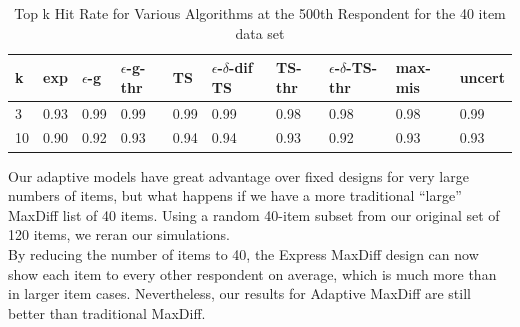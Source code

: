 \documentclass[a4paper,12pt]{article}
\newcommand{\fixedexpressS}{\textbf{exp}}
\newcommand{\egreedyS}{$\epsilon$-\textbf{g}}
\newcommand{\egreedythresS}{$\epsilon$-\textbf{g-thr}}
\newcommand{\misminS}{\textbf{max-mis}}
\newcommand{\tsS}{\textbf{TS} }
\newcommand{\edtsS}{$\epsilon$-$\delta$-\textbf{dif TS} }
\newcommand{\tsthresS}{\textbf{TS-thr} }
\newcommand{\edtsthresS}{$\epsilon$-$\delta$-\textbf{TS-thr} }
\newcommand{\uncertS}{\textbf{uncert} }
\begin{document}
\begin{table}
\begin{center}
\begin{tabular}{llllllllll}
\hline   k &  \fixedexpressS & \egreedyS&\egreedythresS&\tsS&\edtsS&\tsthresS&\edtsthresS& \misminS& \uncertS \\ \hline    
3 & 0.93 & 0.99 & 0.99 & 0.99 & 0.99 & 0.98 & 0.98 & 0.98 &  0.99 \\  10 & 0.90 &   0.92 &  0.93  & 0.94 & 0.94 & 0.93 &    0.92 & 0.93 &  0.93 \end{tabular}
\end{center}
\caption{Top k Hit Rate for Various Algorithms at the 500th Respondent for the 40 item data set}
\label{table:40at500}
\end{table}
Our adaptive models have great advantage over fixed designs for very large numbers of items, but what happens if we have a more traditional ``large'' MaxDiff list of 40 items. Using a random 40-item subset from our original set of 120 items, we reran our simulations. \\
By reducing the number of items to 40, the Express MaxDiff design can now show each item to every other respondent on average, which is much more than in larger item cases.
Nevertheless, our results for Adaptive MaxDiff are still better than traditional MaxDiff.
\end{document}
